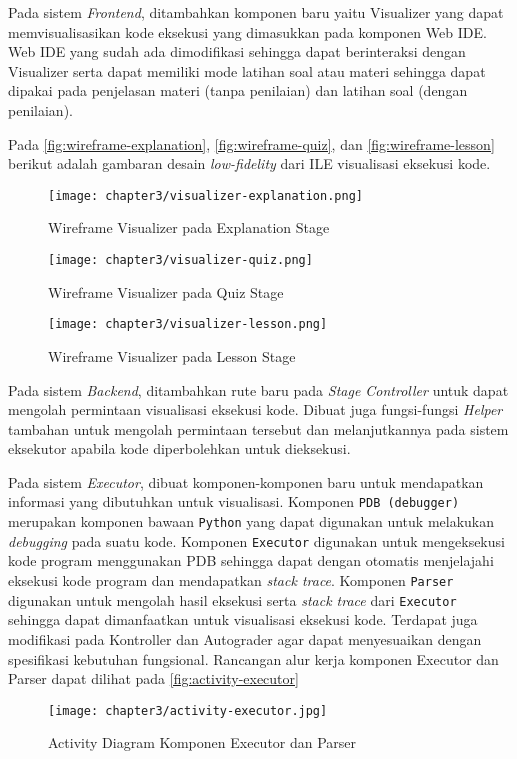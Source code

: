 Pada sistem \textit{Frontend}, ditambahkan komponen baru yaitu Visualizer yang dapat memvisualisasikan kode eksekusi yang dimasukkan pada komponen Web IDE. Web IDE yang sudah ada dimodifikasi sehingga dapat berinteraksi dengan Visualizer serta dapat memiliki mode latihan soal atau materi sehingga dapat dipakai pada penjelasan materi (tanpa penilaian) dan latihan soal (dengan penilaian).

Pada \autoref{fig:wireframe-explanation}, \autoref{fig:wireframe-quiz}, dan \autoref{fig:wireframe-lesson} berikut adalah gambaran desain \textit{low-fidelity} dari ILE visualisasi eksekusi kode.

\begin{figure}[H]
  \centering
  \texttt{[image: chapter3/visualizer-explanation.png]}
  \caption{Wireframe Visualizer pada Explanation Stage} \label{fig:wireframe-explanation}
\end{figure}

\begin{figure}[H]
  \centering
  \texttt{[image: chapter3/visualizer-quiz.png]}
  \caption{Wireframe Visualizer pada Quiz Stage} \label{fig:wireframe-quiz}
\end{figure}

\begin{figure}[H]
  \centering
  \texttt{[image: chapter3/visualizer-lesson.png]}
  \caption{Wireframe Visualizer pada Lesson Stage} \label{fig:wireframe-lesson}
\end{figure}

Pada sistem \textit{Backend}, ditambahkan rute baru pada \textit{Stage Controller} untuk dapat mengolah permintaan visualisasi eksekusi kode. Dibuat juga fungsi-fungsi \textit{Helper} tambahan untuk mengolah permintaan tersebut dan melanjutkannya pada sistem eksekutor apabila kode diperbolehkan untuk dieksekusi.

Pada sistem \textit{Executor}, dibuat komponen-komponen baru untuk mendapatkan informasi yang dibutuhkan untuk visualisasi. Komponen \verb|PDB (debugger)| merupakan komponen bawaan \verb|Python| yang dapat digunakan untuk melakukan \textit{debugging} pada suatu kode. Komponen \verb|Executor| digunakan untuk mengeksekusi kode program menggunakan PDB sehingga dapat dengan otomatis menjelajahi eksekusi kode program dan mendapatkan \textit{stack trace}. Komponen \verb|Parser| digunakan untuk mengolah hasil eksekusi serta \textit{stack trace} dari \verb|Executor| sehingga dapat dimanfaatkan untuk visualisasi eksekusi kode. Terdapat juga modifikasi pada Kontroller dan Autograder agar dapat menyesuaikan dengan spesifikasi kebutuhan fungsional. Rancangan alur kerja komponen Executor dan Parser dapat dilihat pada \autoref{fig:activity-executor}

\begin{figure}[H]
  \centering
  \texttt{[image: chapter3/activity-executor.jpg]}
  \caption{Activity Diagram Komponen Executor dan Parser} \label{fig:activity-executor}
\end{figure}